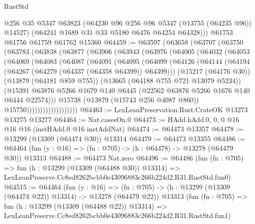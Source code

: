 \begin{lexlean}{RustStd}
\begin{coremodule}
        @256
        @35
        @5347
        @63823
        (@64230 @96 @256 @96 @5347 (@13755 (@64235 @96)) @14527)
        (@64241 @1689 @31 @33 @5180 @6476 @64254 @64328)))
    @61753
    @61756
    @61759
    @61762
    @15360
@64459 := @63597
    (@63658
      (@63707
        (@63750
          (@63783
            (@63838
              (@63877
                (@63906
                  (@63943
                    (@63976
                      (@64005
                        (@64032
                          (@64053
                            (@64069
                              (@64083
                                (@64087
                                  (@64091
                                    (@64095
                                      (@64099
                                        (@64126
                                          (@64144
                                            (@64194
                                              (@64267 (@64279 (@64337 (@64358 @64399)) @64399)))
                                            (@15217 (@64176 @30))
                                            (@13879 (@64181 @859 @755))
                                            (@13665 (@64188 @755 @721 @13079 @5234))
                                            (@15391
                                              @63876
                                              @5266
                                              @1679
                                              @140
                                              @6445
                                              (@22562 @63876 @5266 @1676 @140 @6444 @22574)))
                                          @15738
                                          (@13879 (@15743 @256 @4087 @860))
                                          @15750)))))))))))))))))))
@64463 := LexLeanPreservation.Rust.CrateOK @13273 @13275 @13277
@64464 := Nat.casesOn.{0}
@64473 := HAdd.hAdd.{0, 0, 0} @16 @16 @16 (instHAdd.{0} @16 instAddNat)
@64474 := @64473 @13357
@64478 := @13299 (@13309 (@64474 @30)) @13314
@64479 := @64473 @13355
@64486 := @64464 (fun (y : @16) => (fn : @705) -> (h : @64478) -> @13278 (@64479 @30)) @13313
@64488 := @64473 Nat.zero
@64496 := @64486
    (fun (fn : @705) =>
    fun (h : @13299 (@13309 (@64488 @30)) @13314) =>
    LexLeanPreserve.Cc8ed8262bcbb0e43096883c266b224d2.R31.RustStd.fun0)
@64515 := @64464
    (fun (y : @16) =>
    (fn : @705) -> (h : @13299 (@13309 (@64474 @22)) @13314) -> @13278 (@64479 @22))
    @13313
    (fun (fn : @705) =>
    fun (h : @13299 (@13309 (@64488 @22)) @13314) =>
    LexLeanPreserve.Cc8ed8262bcbb0e43096883c266b224d2.R31.RustStd.fun1)

\end{coremodule}
\end{lexlean}
